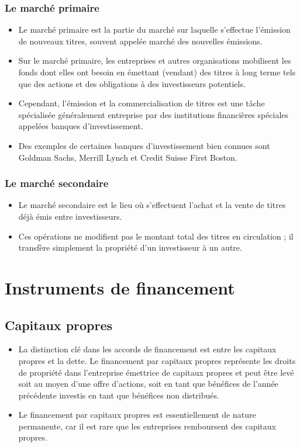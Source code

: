 \documentclass[letterpaper, 12pt]{article}
\newcommand{\1}{\mathds{1}}	%
\theoremstyle{definition}
\begin{document}
\subsubsection{Le marché primaire}
\begin{itemize}
\item Le marché primaire est la partie du marché sur laquelle s'effectue l'émission de nouveaux titres, souvent appelée marché des nouvelles émissions. 
\item Sur le marché primaire, les entreprises et autres organisations mobilisent les fonds dont elles ont besoin en émettant (vendant) des titres à long terme tels que des actions et des obligations à des investisseurs potentiels. 
\item Cependant, l'émission et la commercialisation de titres est une tâche spécialisée généralement entreprise par des institutions financières spéciales appelées banques d'investissement. 
\item Des exemples de certaines banques d'investissement bien connues sont Goldman Sachs, Merrill Lynch et Credit Suisse First Boston.
\end{itemize}
\subsubsection{Le marché secondaire}
\begin{itemize}
\item Le marché secondaire est le lieu où s'effectuent l'achat et la vente de titres déjà émis entre investisseurs. 
\item Ces opérations ne modifient pas le montant total des titres en circulation ; il transfère simplement la propriété d'un investisseur à un autre.
\end{itemize}

\section{Instruments de financement}
\subsection{Capitaux propres}
\begin{itemize}
\item La distinction clé dans les accords de financement est entre les capitaux propres et la dette. Le financement par capitaux propres représente les droits de propriété dans l'entreprise émettrice de capitaux propres et peut être levé soit au moyen d'une offre d'actions, soit en tant que bénéfices de l'année précédente investis en tant que bénéfices non distribués. 
\item Le financement par capitaux propres est essentiellement de nature permanente, car il est rare que les entreprises remboursent des capitaux propres.
\end{itemize}
\end{document}
